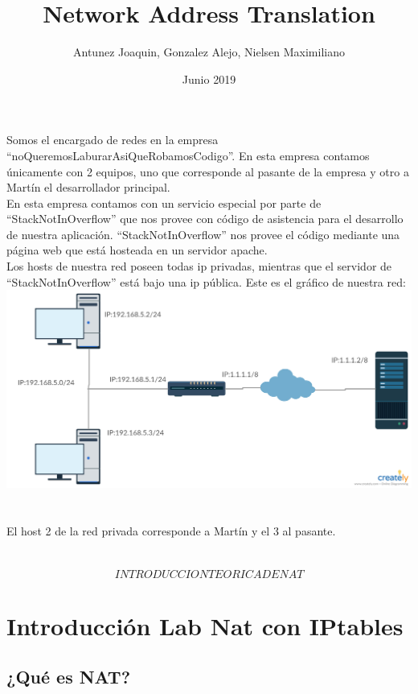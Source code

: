 \documentclass{article}
\title {Network Address Translation}
\author{Antunez Joaquin, Gonzalez Alejo, Nielsen Maximiliano}
\date{Junio 2019}
\begin{document}
 
\begin{titlepage}
\pagestyle{empty}
\maketitle
\thispagestyle{empty}
\end{titlepage}


Somos el encargado de redes en la empresa “noQueremosLaburarAsiQueRobamosCodigo”. En esta empresa contamos únicamente con 2 equipos, uno que corresponde al pasante de la empresa y otro a Martín el desarrollador principal.\\ 
En esta empresa contamos con un servicio especial por parte de “StackNotInOverflow” que nos provee con código de asistencia para el desarrollo de nuestra aplicación.  “StackNotInOverflow” nos provee el código mediante una página web que está hosteada en un servidor apache. \\
Los hosts de nuestra red poseen todas ip privadas, mientras que el servidor de “StackNotInOverflow” está bajo una ip pública.
Este es el gráfico de nuestra red:
\\
\includegraphics[width=\textwidth]{graficolab}
\\\\ \hfill \\
El host 2 de la red privada corresponde a Martín y el 3 al pasante.
\\\\ \hfill \\
\[INTRODUCCION TEORICA DE NAT\]
\section*{Introducción Lab Nat con IPtables}

\subsection*{¿Qué es NAT?}
\end{document}
